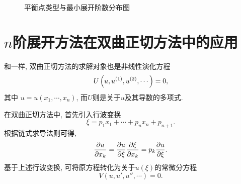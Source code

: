\begin{figure}[htbp]
\centering
{}
\caption{平衡点类型与最小展开阶数分布图}
\end{figure}

\section{$n$阶展开方法在双曲正切方法中的应用}\label{ch4sec5}
和一样, 双曲正切方法的求解对象也是非线性演化方程
\begin{equation}
    U\left(u,u^{(1)},u^{(2)},\cdots\right)=0,
\end{equation}
其中 $u=u(x_1,\cdots,x_n)$, 而$U$则是关于$u$及其导数的多项式. 

在双曲正切方法中, 首先引入行波变换 
\begin{equation}
    \xi = p_1 x_1 +\cdots + p_n x_n + p_{n+1}.  \label{tanh-tw}
\end{equation}
根据链式求导法则可得,
\begin{equation}
    \frac{\partial u}{\partial x_k}=\frac{\partial u}{\partial \xi}\frac{\partial \xi}{\partial x_k}=p_k\frac{\partial u}{\partial \xi}.
\end{equation}
基于上述行波变换, 可将原方程转化为关于$u(\xi)$的常微分方程
\begin{equation}
    V(u,u',u'',\cdots)=0. \label{odeq}
\end{equation}

